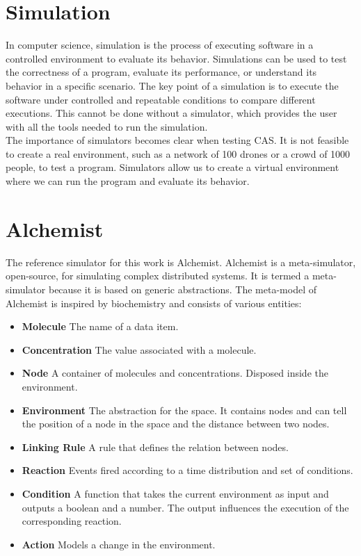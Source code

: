 \documentclass[12pt,a4paper,openright,twoside]{book}
\begin{document}
\section{Simulation}

In computer science, simulation is the process of executing software in a controlled environment to evaluate its behavior. 
Simulations can be used to test the correctness of a program, evaluate its performance, or understand its behavior in a specific scenario. 
The key point of a simulation is to execute the software under controlled and repeatable conditions to compare different executions. 
This cannot be done without a simulator, which provides the user with all the tools needed to run the simulation. \cite{argun2021simulation, bagrodia1998parsec} \\
The importance of simulators becomes clear when testing \ac{CAS}. 
It is not feasible to create a real environment, such as a network of 100 drones or a crowd of 1000 people, to test a program.
Simulators allow us to create a virtual environment where we can run the program and evaluate its behavior. \\

\section{Alchemist}

The reference simulator for this work is Alchemist. \cite{Pianini_2013}
Alchemist is a meta-simulator, open-source, for simulating complex distributed systems. It is termed a meta-simulator because it is based on generic abstractions. 
The meta-model of Alchemist is inspired by biochemistry and consists of various entities:
\begin{itemize}
  \item \textbf{Molecule} The name of a data item.
  \item \textbf{Concentration} The value associated with a molecule.
  \item \textbf{Node} A container of molecules and concentrations. Disposed inside the environment.
  \item \textbf{Environment} The abstraction for the space. It contains nodes and can tell the position of a node in the space and the distance between two nodes.
  \item \textbf{Linking Rule} A rule that defines the relation between nodes.
  \item \textbf{Reaction} Events fired according to a time distribution and set of conditions.
  \item \textbf{Condition} A function that takes the current environment as input and outputs a boolean and a number. The output influences the execution of the corresponding reaction.
  \item \textbf{Action} Models a change in the environment.
\end{itemize}
\end{document}
